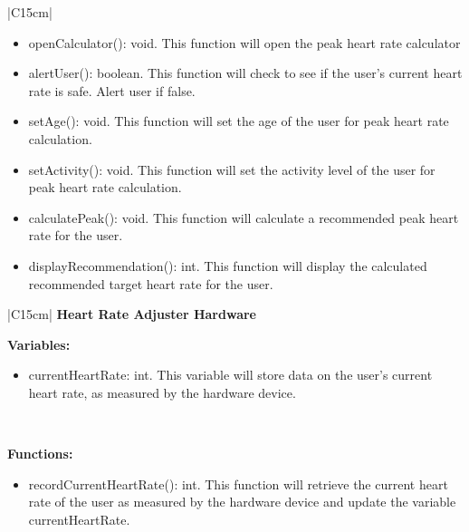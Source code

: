 \documentclass[letterpaper,english, 12pt]{scrreprt}
\begin{document}
\begin{center}
\begin{tabular}{|C{15cm}|}
\begin{itemize}
					\item openCalculator(): void. This function will open the peak heart rate calculator
					\item alertUser(): boolean. This function will check to see if the user's current heart rate is safe. Alert user if false.
					\item setAge(): void. This function will set the age of the user for peak heart rate calculation.
					\item setActivity(): void. This function will set the activity level of the user for peak heart rate calculation.
					\item calculatePeak(): void. This function will calculate a recommended peak heart rate for the user.
					\item displayRecommendation(): int. This function will display the calculated recommended target heart rate for the user.
				\end{itemize}
			\cr \hline
	\end{tabular}
\end{center}

\begin{center}
	\begin{tabular}{|C{15cm}|}
		\hline
			\textbf{Heart Rate Adjuster Hardware} \\
		\hline
			\begin{flushleft}
				\textbf{Variables:} \\
			\end{flushleft}
				\begin{itemize}
					\item currentHeartRate: int. This variable will store data on the user's current heart rate, as measured by the hardware device.
				\end{itemize} \\
			\hline
			\begin{flushleft}
				\textbf{Functions: } \\
			\end{flushleft}
				\begin{itemize}
					\item recordCurrentHeartRate(): int. This function will retrieve the current heart rate of the user as measured by the hardware device and update the variable currentHeartRate.
				\end{itemize}
			\cr \hline
	\end{tabular}
\end{center}
\end{document}
